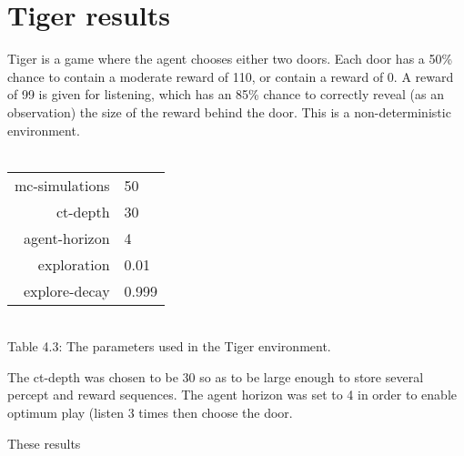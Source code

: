 \documentclass[pdftex,twoside,a4paper]{report}
\begin{document}
\section{Tiger results}
Tiger is a game where the agent chooses either two doors. Each door has a 50\% chance to contain a moderate reward of 110, or contain a reward of 0. A reward of 99 is given for listening, which has an 85\% chance to correctly reveal (as an observation) the size of the reward behind the door. This is a non-deterministic environment.\\\\
\begin{center}
\begin{tabular}{| r | l | }
\hline
mc-simulations & 50\\
ct-depth & 30\\
agent-horizon & 4\\
exploration & 0.01\\
explore-decay & 0.999\\
\hline
\end{tabular}\\
\vspace{0.5mm}
Table 4.3: The parameters used in the Tiger environment.
\end{center}
The ct-depth was chosen to be 30 so as to be large enough to store several percept and reward sequences. The agent horizon was set to 4 in order to enable optimum play (listen 3 times then choose the door.

These results 
\end{document}
